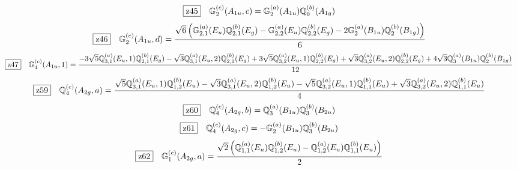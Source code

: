 \documentclass[fleqn,10pt,landscape]{jsarticle}
\begin{document}
\begin{dmath*}
\hspace*{3mm}\fbox{z45}\quad \mathbb{G}_{2}^{(c)}(A_{1u},c)=\mathbb{G}_{2}^{(a)}(A_{1u}) \mathbb{Q}_{0}^{(b)}(A_{1g})
\end{dmath*}
\begin{dmath*}
\hspace*{3mm}\fbox{z46}\quad \mathbb{G}_{2}^{(c)}(A_{1u},d)=\frac{\sqrt{6} \left(\mathbb{G}_{2,1}^{(a)}(E_{u}) \mathbb{Q}_{2,1}^{(b)}(E_{g}) - \mathbb{G}_{2,2}^{(a)}(E_{u}) \mathbb{Q}_{2,2}^{(b)}(E_{g}) - 2 \mathbb{G}_{2}^{(a)}(B_{1u}) \mathbb{Q}_{2}^{(b)}(B_{1g})\right)}{6}
\end{dmath*}
\begin{dmath*}
\hspace*{3mm}\fbox{z47}\quad \mathbb{G}_{4}^{(c)}(A_{1u},1)=\frac{- 3 \sqrt{5} \mathbb{Q}_{3,1}^{(a)}(E_{u},1) \mathbb{Q}_{2,1}^{(b)}(E_{g}) - \sqrt{3} \mathbb{Q}_{3,1}^{(a)}(E_{u},2) \mathbb{Q}_{2,1}^{(b)}(E_{g}) + 3 \sqrt{5} \mathbb{Q}_{3,2}^{(a)}(E_{u},1) \mathbb{Q}_{2,2}^{(b)}(E_{g}) + \sqrt{3} \mathbb{Q}_{3,2}^{(a)}(E_{u},2) \mathbb{Q}_{2,2}^{(b)}(E_{g}) + 4 \sqrt{3} \mathbb{Q}_{3}^{(a)}(B_{1u}) \mathbb{Q}_{2}^{(b)}(B_{1g})}{12}
\end{dmath*}
\begin{dmath*}
\hspace*{3mm}\fbox{z59}\quad \mathbb{Q}_{4}^{(c)}(A_{2g},a)=\frac{\sqrt{5} \mathbb{Q}_{3,1}^{(a)}(E_{u},1) \mathbb{Q}_{1,2}^{(b)}(E_{u}) - \sqrt{3} \mathbb{Q}_{3,1}^{(a)}(E_{u},2) \mathbb{Q}_{1,2}^{(b)}(E_{u}) - \sqrt{5} \mathbb{Q}_{3,2}^{(a)}(E_{u},1) \mathbb{Q}_{1,1}^{(b)}(E_{u}) + \sqrt{3} \mathbb{Q}_{3,2}^{(a)}(E_{u},2) \mathbb{Q}_{1,1}^{(b)}(E_{u})}{4}
\end{dmath*}
\begin{dmath*}
\hspace*{3mm}\fbox{z60}\quad \mathbb{Q}_{4}^{(c)}(A_{2g},b)=\mathbb{Q}_{3}^{(a)}(B_{1u}) \mathbb{Q}_{3}^{(b)}(B_{2u})
\end{dmath*}
\begin{dmath*}
\hspace*{3mm}\fbox{z61}\quad \mathbb{Q}_{4}^{(c)}(A_{2g},c)=- \mathbb{G}_{2}^{(a)}(B_{1u}) \mathbb{Q}_{3}^{(b)}(B_{2u})
\end{dmath*}
\begin{dmath*}
\hspace*{3mm}\fbox{z62}\quad \mathbb{G}_{1}^{(c)}(A_{2g},a)=\frac{\sqrt{2} \left(\mathbb{Q}_{1,1}^{(a)}(E_{u}) \mathbb{Q}_{1,2}^{(b)}(E_{u}) - \mathbb{Q}_{1,2}^{(a)}(E_{u}) \mathbb{Q}_{1,1}^{(b)}(E_{u})\right)}{2}
\end{dmath*}
\end{document}
